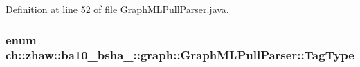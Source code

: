 Definition at line 52 of file GraphMLPullParser.java.\hypertarget{classch_1_1zhaw_1_1ba10__bsha__1_1_1graph_1_1GraphMLPullParser_a3a47e280c52cfcf49f188060f23cac7f}{
\subsubsection[{TagType}]{\setlength{\rightskip}{0pt plus 5cm}enum {\bf ch::zhaw::ba10\_\-bsha\_::graph::GraphMLPullParser::TagType}}}
\label{classch_1_1zhaw_1_1ba10__bsha__1_1_1graph_1_1GraphMLPullParser_a3a47e280c52cfcf49f188060f23cac7f}
